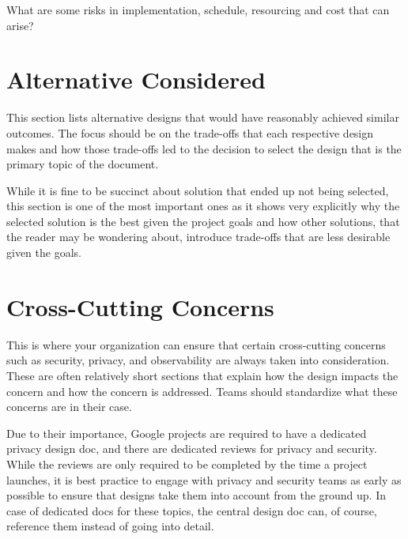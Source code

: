 \documentclass{article}
\begin{document}
What are some risks in implementation, schedule, resourcing and cost that can arise?

\pagebreak
\section{Alternative Considered}

This section lists alternative designs that would have reasonably achieved similar outcomes. The focus should be on the trade-offs that each respective design makes and how those trade-offs led to the decision to select the design that is the primary topic of the document.

While it is fine to be succinct about solution that ended up not being selected, this section is one of the most important ones as it shows very explicitly why the selected solution is the best given the project goals and how other solutions, that the reader may be wondering about, introduce trade-offs that are less desirable given the goals.

\pagebreak
\section{Cross-Cutting Concerns}

This is where your organization can ensure that certain cross-cutting concerns such as security, privacy, and observability are always taken into consideration. These are often relatively short sections that explain how the design impacts the concern and how the concern is addressed. Teams should standardize what these concerns are in their case.

Due to their importance, Google projects are required to have a dedicated privacy design doc, and there are dedicated reviews for privacy and security. While the reviews are only required to be completed by the time a project launches, it is best practice to engage with privacy and security teams as early as possible to ensure that designs take them into account from the ground up. In case of dedicated docs for these topics, the central design doc can, of course, reference them instead of going into detail.
\end{document}

